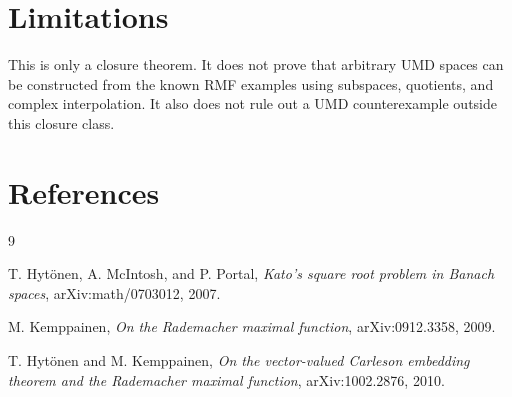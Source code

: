 \documentclass[11pt]{article}
\begin{document}
\section*{Limitations}

This is only a closure theorem.  It does not prove that arbitrary UMD spaces can be constructed from the known RMF examples using subspaces, quotients, and complex interpolation.  It also does not rule out a UMD counterexample outside this closure class.

\section*{References}

\begin{thebibliography}{9}

T. Hyt\"onen, A. McIntosh, and P. Portal,
\emph{Kato's square root problem in Banach spaces},
arXiv:math/0703012, 2007.

M. Kemppainen,
\emph{On the Rademacher maximal function},
arXiv:0912.3358, 2009.

T. Hyt\"onen and M. Kemppainen,
\emph{On the vector-valued Carleson embedding theorem and the Rademacher maximal function},
arXiv:1002.2876, 2010.

\end{thebibliography}
\end{document}
